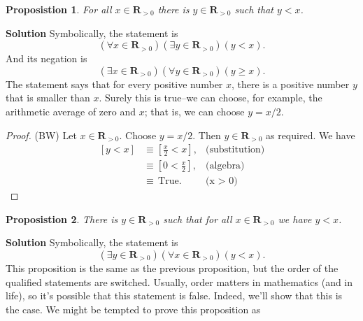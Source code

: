 \documentclass[12pt,fleqn,answers]{exam}
\newcommand{\reals}{\mathbf{R}}
\newcommand{\true}{\, \mathrm{True}}
\newenvironment{myproof}
  {\begin{shaded}\begin{proof}}
  {\end{proof}\end{shaded}}
\newtheorem{prop}{Proposistion}
\begin{document}
    \begin{prop}   For all $x \in \reals_{>0}$ there is 
      $y \in \reals_{> 0}$ such that $y < x$. 
    \end{prop}
     
    \noindent \textbf{Solution} Symbolically, the statement is 
      \begin{equation*}
         \left(\forall x \in \reals_{>0}\right) \left(\exists y \in \reals_{>0}\right)(y < x).
      \end{equation*}
      And its negation is
       \begin{equation*}
         \left(\exists x \in \reals_{>0}\right) \left(\forall y \in \reals_{>0}\right)(y \geq  x).
      \end{equation*}
      The statement says that for every positive number $x$, there is a positive number $y$ that is smaller than $x$. 
      Surely this is true--we can choose, for example, the 
      arithmetic average of zero and $x$; that is, we can choose    
      $y=x/2$.
      
      \begin{myproof} (BW) Let $x \in \reals_{>0}$. Choose $y = x/2$. Then $y \in \reals_{>0}$ as required. We have
         \begin{align*}
         \left[y < x \right] &\equiv \left[\frac{x}{2} < x \right], &\mbox{(substitution)} \\
                                   &\equiv \left[0 < \frac{x}{2}  \right], &\mbox{(algebra)} \\
                                   &\equiv \true.  &\mbox{(x > 0)}
      \end{align*}
      \end{myproof}

      
      \begin{prop} There is $y \in \reals_{> 0}$ such that for all 
        $x \in \reals_{>0}$ we have $y < x$.
      \end{prop}
       
      \noindent \textbf{Solution}  Symbolically, the statement is
       \begin{equation*}
         \left(\exists y \in \reals_{>0}\right)\left(\forall x \in \reals_{>0}\right) \left(y < x \right).
       \end{equation*}
       This proposition is the same as the previous proposition, but
       the order of the qualified statements are switched. Usually,
       order matters in mathematics (and in life), so it's possible 
       that this statement is false. Indeed, we'll show that this 
       is the case. We might be tempted to prove this proposition as
\end{document}
